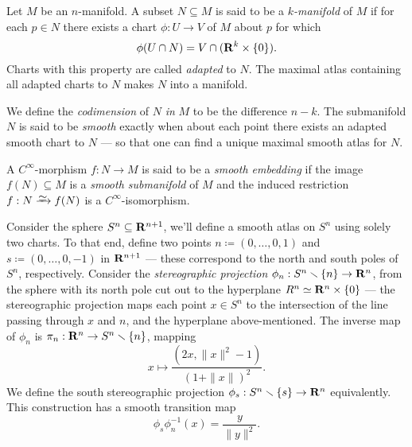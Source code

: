 \begin{definition}[Submanifold]
    \label{def:submanifold}
    Let \(M\) be an \(n\)-manifold. A subset \(N \subseteq M\) is said to be a
    \emph{\(k\)-manifold} of \(M\) if for each \(p \in N\) there exists a chart
    \(\phi: U \to V\) of \(M\) about \(p\) for which
    \[
        \phi(U \cap N) = V \cap (\mathbf{R}^k \times \{0\}).
    \]
    Charts with this property are called \emph{adapted} to \(N\). The maximal atlas
    containing all adapted charts to \(N\) makes \(N\) into a manifold.

    We define the \emph{codimension} of \(N\) \emph{in} \(M\) to be the difference
    \(n - k\). The submanifold \(N\) is said to be \emph{smooth} exactly when about
    each point there exists an adapted smooth chart to \(N\) --- so that one can
    find a unique maximal smooth atlas for \(N\).
\end{definition}

\begin{definition}
    \label{def:smooth-embedding}
    A \(C^{\infty}\)-morphism \(f: N \to M\) is said to be a \emph{smooth embedding}
    if the image \(f(N) \subseteq M\) is a \emph{smooth submanifold} of \(M\) and
    the induced restriction \(f: N \isoto f(N)\) is a \(C^{\infty}\)-isomorphism.
\end{definition}

\begin{example}[Sphere]
    \label{exp:sphere-smooth-manifold}
    Consider the sphere \(S^n \subseteq \mathbf{R}^{n+1}\), we'll define a smooth atlas on
    \(S^n\) using solely two charts. To that end, define two points
    \(n \coloneq (0, \dots, 0, 1)\) and \(s \coloneq (0, \dots, 0, -1)\) in
    \(\mathbf{R}^{n+1}\) --- these correspond to the north and south poles of \(S^n\),
    respectively. Consider the \emph{stereographic projection}
    \(\phi_n: S^n \smallsetminus \{n\} \to \mathbf{R}^n\), from the sphere with its north pole
    cut out to the hyperplane \(R^n \simeq \mathbf{R}^n \times \{0\}\) --- the stereographic
    projection maps each point \(x \in S^n\) to the intersection of the line passing
    through \(x\) and \(n\), and the hyperplane above-mentioned. The inverse map of
    \(\phi_n\) is \(\pi_n: \mathbf{R}^n \to S^n \smallsetminus \{n\}\), mapping
    \[
        x \longmapsto \frac{(2 x, \| x \|^2 - 1)}{(1 + \| x \|)^2}.
    \]
    We define the south stereographic projection \(\phi_s: S^n \smallsetminus \{s\} \to
    \mathbf{R}^n\) equivalently. This construction has a smooth transition map
    \[
        \phi_s \phi_n^{-1}(x) = \frac{y}{\| y \|^2}.
    \]
\end{example}


